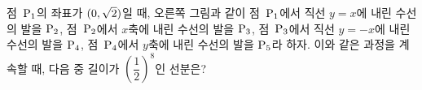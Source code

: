 \noindent\begin{minipage}[t]{0.58\linewidth}\vspace{0pt}\raggedright 점~$\mathrm{P_1}$의 좌표가 $(0{,}\mkern3mu\mathopen{}\sqrt{2})$일 때, 오른쪽 그림과 같이 점~$\mathrm{P_1}$에서 직선 $y=x$에 내린 수선의 발을 $\mathrm{P_2}$, 점~$\mathrm{P_2}$에서 $x$축에 내린 수선의 발을 $\mathrm{P_3}$, 점~$\mathrm{P_3}$에서 직선 $y=-x$에 내린 수선의 발을 $\mathrm{P_4}$, 점~$\mathrm{P_4}$에서 $y$축에 내린 수선의 발을 $\mathrm{P_5}$라 하자. 이와 같은 과정을 계속할 때, 다음 중 길이가 $\left(\dfrac{1}{2}\right)^{8}$인 선분은?\end{minipage}\hfill\begin{minipage}[t]{0.4\linewidth}\vspace{0pt}\centering \resizebox{\ifdim\width>\linewidth\linewidth\else\width\fi}{!}{}\end{minipage}\par
{}
